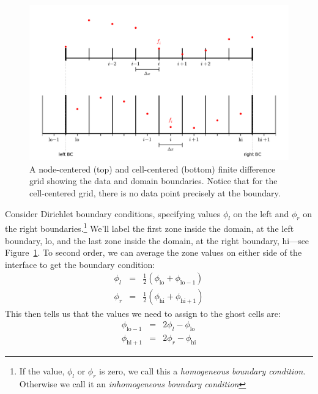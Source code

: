 \begin{figure}[h]
\centering
\includegraphics[width=\linewidth]{fv-fd_grid_bc}
\caption[Node-centered vs.\ cell-centered data at boundaries]{\label{mg:fig:bcs} 
  A node-centered (top) and cell-centered (bottom) finite difference
  grid showing the data and domain boundaries.  Notice that for the 
  cell-centered grid, there is no data point precisely at the boundary.}
\end{figure}

Consider Dirichlet boundary conditions, specifying values $\phi_l$ on
the left and $\phi_r$ on the right boundaries.\footnote{If the value,
  $\phi_l$ or $\phi_r$ is zero, we call this a {\em homogeneous
    boundary condition}.  Otherwise we call it an {\em inhomogeneous
    boundary condition}} We'll label the first zone inside the domain,
at the left boundary, $\mathrm{lo}$, and the last zone inside the
domain, at the right boundary, $\mathrm{hi}$---see
Figure~\ref{mg:fig:bcs}.  To second order, we can average the zone values on 
either side of the interface to get the boundary condition:
\begin{eqnarray}
\phi_l &=& \frac{1}{2} ( \phi_\mathrm{lo} + \phi_\mathrm{lo-1} ) \\
\phi_r &=& \frac{1}{2} ( \phi_\mathrm{hi} + \phi_\mathrm{hi+1} )
\end{eqnarray}
This then tells us that the values we need to assign to the ghost cells are:
\begin{eqnarray}
\label{eq:bc_inhomo_dir}
\phi_\mathrm{lo-1} &=& 2 \phi_l - \phi_\mathrm{lo} \\
\phi_\mathrm{hi+1} &=& 2 \phi_r - \phi_\mathrm{hi}
\end{eqnarray}

